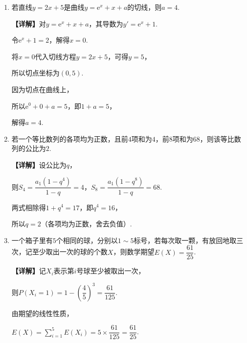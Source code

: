 \documentclass[12pt,a4paper]{article}
\begin{document}
	\begin{enumerate}[leftmargin=*,label=\arabic*.,resume,itemsep=0.8ex]
		\item 若直线$y=2x+5$是曲线$y=\mathrm{e}^x+x+a$的切线，则$a=$\underline{\quad$4$\quad}.
		
		\textbf{【详解】}对$y=\mathrm{e}^x+x+a$，其导数为$y'=\mathrm{e}^x+1$.
		
		令$\mathrm{e}^x+1=2$，解得$x=0$.
		
		将$x=0$代入切线方程$y=2x+5$，可得$y=5$，
		
		所以切点坐标为$(0,5)$.
		
		因为切点在曲线上，
		
		所以$\mathrm{e}^0+0+a=5$，即$1+a=5$，
		
		解得$a=4$.
		
		\item 若一个等比数列的各项均为正数，且前$4$项和为$4$，前$8$项和为$68$，则该等比数列的公比为\underline{\quad$2$\quad}.
		
		\textbf{【详解】}设公比为$q$，
		
		则$S_4=\dfrac{a_1(1-q^4)}{1-q}=4$，$S_8=\dfrac{a_1(1-q^8)}{1-q}=68$.
		
		两式相除得$1+q^4=17$，即$q^4=16$，
		
		所以$q=2$（各项均为正数，舍去负值）.
		
		\item 一个箱子里有$5$个相同的球，分别以$1\sim5$标号，若每次取一颗，有放回地取三次，记至少取出一次的球的个数$X$，则数学期望$E(X)=$\underline{\quad$\dfrac{61}{25}$\quad}.
		
		\textbf{【详解】}记$X_i$表示第$i$号球至少被取出一次，
		
		则$P(X_i=1)=1-\left(\dfrac45\right)^3=\dfrac{61}{125}$.
		
		由期望的线性性质，
		
		$E(X)=\sum\limits_{i=1}^5 E(X_i)=5\times\dfrac{61}{125}=\dfrac{61}{25}$.
		
	\end{enumerate}
	\vspace{0.3cm}
\end{document}
